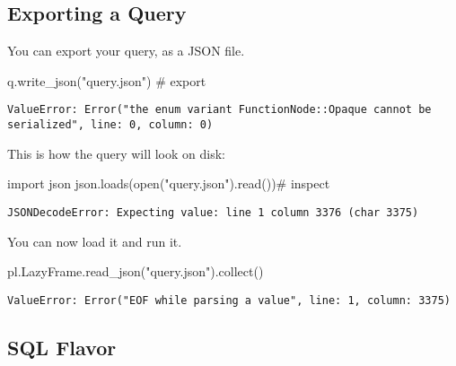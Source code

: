 \documentclass[
  letterpaper,
  DIV=11,
  numbers=noendperiod]{scrartcl}
\newenvironment{Shaded}{\begin{snugshade}}{\end{snugshade}}
\newcommand{\BuiltInTok}[1]{\textcolor[rgb]{0.00,0.23,0.31}{#1}}
\newcommand{\CommentTok}[1]{\textcolor[rgb]{0.37,0.37,0.37}{#1}}
\newcommand{\ImportTok}[1]{\textcolor[rgb]{0.00,0.46,0.62}{#1}}
\newcommand{\NormalTok}[1]{\textcolor[rgb]{0.00,0.23,0.31}{#1}}
\newcommand{\StringTok}[1]{\textcolor[rgb]{0.13,0.47,0.30}{#1}}
\begin{document}
\hypertarget{exporting-a-query}{%
\subsection{Exporting a Query}\label{exporting-a-query}}

You can export your query, as a JSON file.

\begin{Shaded}
\begin{Highlighting}[]
\NormalTok{q.write\_json(}\StringTok{"query.json"}\NormalTok{) }\CommentTok{\# export}
\end{Highlighting}
\end{Shaded}

\begin{verbatim}
ValueError: Error("the enum variant FunctionNode::Opaque cannot be serialized", line: 0, column: 0)
\end{verbatim}

This is how the query will look on disk:

\begin{Shaded}
\begin{Highlighting}[]
\ImportTok{import}\NormalTok{ json}
\NormalTok{json.loads(}\BuiltInTok{open}\NormalTok{(}\StringTok{"query.json"}\NormalTok{).read())}\CommentTok{\# inspect}
\end{Highlighting}
\end{Shaded}

\begin{verbatim}
JSONDecodeError: Expecting value: line 1 column 3376 (char 3375)
\end{verbatim}

You can now load it and run it.

\begin{Shaded}
\begin{Highlighting}[]
\NormalTok{pl.LazyFrame.read\_json(}\StringTok{"query.json"}\NormalTok{).collect() }
\end{Highlighting}
\end{Shaded}

\begin{verbatim}
ValueError: Error("EOF while parsing a value", line: 1, column: 3375)
\end{verbatim}

\hypertarget{sql-flavor}{%
\subsection{SQL Flavor}\label{sql-flavor}}
\end{document}
